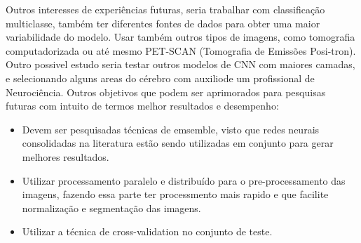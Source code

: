 \documentclass[openright]{UFRGS} %
\begin{document}
Outros interesses de experiências futuras, seria trabalhar com classificação multiclasse, também ter  diferentes fontes de dados para obter uma maior variabilidade do modelo. Usar também outros tipos de imagens, como tomografia computadorizada ou até mesmo PET-SCAN (Tomografia de Emissões Posi-tron). Outro possivel estudo seria  testar outros modelos de CNN com maiores camadas, e selecionando
alguns areas do cérebro com auxiliode um profissional de Neurociência. Outros objetivos que podem ser aprimorados  para  pesquisas futuras com intuito  de termos melhor resultados e desempenho:

\begin{itemize}
 \item Devem ser pesquisadas técnicas de emsemble, visto que redes neurais consolidadas
na literatura estão sendo utilizadas em conjunto para gerar melhores resultados.

 \item Utilizar  processamento paralelo e distribuído para o pre-processamento das imagens, fazendo essa parte ter processmento mais
 rapido e que facilite normalização e segmentação das imagens.

\item Utilizar a técnica de cross-validation no conjunto de teste.

\end{itemize}









% 
\end{document}

